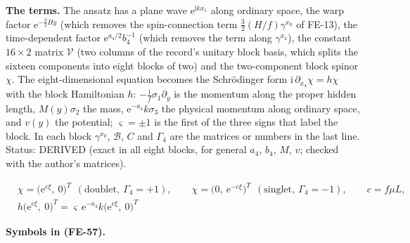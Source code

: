 \documentclass[
  10pt,
]{article}
\begin{document}
\textbf{The terms.} The ansatz has a plane wave
\(\mathrm{e}^{\mathrm{i}kx_1}\) along ordinary space, the warp factor
\(\mathrm{e}^{-\frac32Hy}\) (which removes the spin-connection term
\(\frac32(H/f)\gamma^{x_0}\) of FE-13), the time-dependent factor
\(\mathrm{e}^{a_4/2}b_4^{-1}\) (which removes the term along
\(\gamma^{x_4}\)), the constant \(16 \times 2\) matrix \(\mathcal{V}\)
(two columns of the record's unitary block basis, which splits the
sixteen components into eight blocks of two) and the two-component block
spinor \(\chi\). The eight-dimensional equation becomes the Schrödinger
form \(\mathrm{i}\,\partial_{x_4}\chi = h\chi\) with the block
Hamiltonian \(h\): \(-\frac{\mathrm{i}}{f}\sigma_1\partial_y\) is the
momentum along the proper hidden length, \(M(y)\sigma_2\) the mass,
\(\mathrm{e}^{-a_4}k\sigma_3\) the physical momentum along ordinary
space, and \(v(y)\) the potential; \(\varsigma = \pm1\) is the first of
the three signs that label the block. In each block \(\gamma^{x_0}\),
\(\mathcal{B}\), \(C\) and \(\Gamma_4\) are the matrices or numbers in
the last line. Status: DERIVED (exact in all eight blocks, for general
\(a_4\), \(b_4\), \(M\), \(v\); checked with the author's matrices).

\[
\begin{aligned}
&\chi = \big(\mathrm{e}^{c\xi},\ 0\big)^T\ \ (\text{doublet},\ \Gamma_4 = +1),\qquad
 \chi = \big(0,\ \mathrm{e}^{-c\xi}\big)^T\ \ (\text{singlet},\ \Gamma_4 = -1),\qquad c = f\mu L,\\
&h\big(\mathrm{e}^{c\xi},\ 0\big)^T = \varsigma\,\mathrm{e}^{-a_4}k\big(\mathrm{e}^{c\xi},\ 0\big)^T
\end{aligned} \tag{FE-57}
\]

\textbf{Symbols in (FE-57).}
\end{document}
